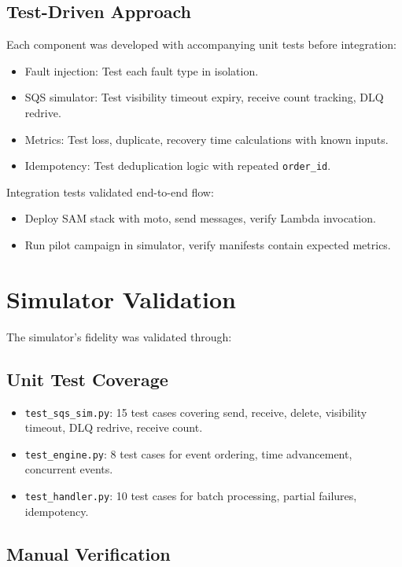 \subsection{Test-Driven Approach}

Each component was developed with accompanying unit tests before integration:
\begin{itemize}
    \item Fault injection: Test each fault type in isolation.
    \item SQS simulator: Test visibility timeout expiry, receive count tracking, DLQ redrive.
    \item Metrics: Test loss, duplicate, recovery time calculations with known inputs.
    \item Idempotency: Test deduplication logic with repeated \texttt{order\_id}.
\end{itemize}

Integration tests validated end-to-end flow:
\begin{itemize}
    \item Deploy SAM stack with moto, send messages, verify Lambda invocation.
    \item Run pilot campaign in simulator, verify manifests contain expected metrics.
\end{itemize}

\section{Simulator Validation}

The simulator's fidelity was validated through:

\subsection{Unit Test Coverage}

\begin{itemize}
    \item \texttt{test\_sqs\_sim.py}: 15 test cases covering send, receive, delete, visibility timeout, DLQ redrive, receive count.
    \item \texttt{test\_engine.py}: 8 test cases for event ordering, time advancement, concurrent events.
    \item \texttt{test\_handler.py}: 10 test cases for batch processing, partial failures, idempotency.
\end{itemize}

\subsection{Manual Verification}

